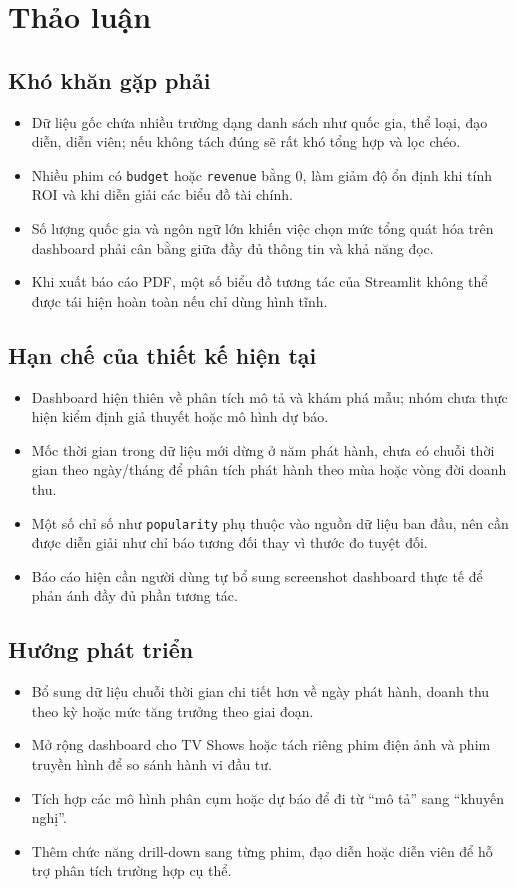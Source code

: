 \section{Thảo luận}

\subsection{Khó khăn gặp phải}
\begin{itemize}[leftmargin=2em]
    \item Dữ liệu gốc chứa nhiều trường dạng danh sách như quốc gia, thể loại, đạo diễn, diễn viên; nếu không tách đúng sẽ rất khó tổng hợp và lọc chéo.
    \item Nhiều phim có \texttt{budget} hoặc \texttt{revenue} bằng 0, làm giảm độ ổn định khi tính ROI và khi diễn giải các biểu đồ tài chính.
    \item Số lượng quốc gia và ngôn ngữ lớn khiến việc chọn mức tổng quát hóa trên dashboard phải cân bằng giữa đầy đủ thông tin và khả năng đọc.
    \item Khi xuất báo cáo PDF, một số biểu đồ tương tác của Streamlit không thể được tái hiện hoàn toàn nếu chỉ dùng hình tĩnh.
\end{itemize}

\subsection{Hạn chế của thiết kế hiện tại}
\begin{itemize}[leftmargin=2em]
    \item Dashboard hiện thiên về phân tích mô tả và khám phá mẫu; nhóm chưa thực hiện kiểm định giả thuyết hoặc mô hình dự báo.
    \item Mốc thời gian trong dữ liệu mới dừng ở năm phát hành, chưa có chuỗi thời gian theo ngày/tháng để phân tích phát hành theo mùa hoặc vòng đời doanh thu.
    \item Một số chỉ số như \texttt{popularity} phụ thuộc vào nguồn dữ liệu ban đầu, nên cần được diễn giải như chỉ báo tương đối thay vì thước đo tuyệt đối.
    \item Báo cáo hiện cần người dùng tự bổ sung screenshot dashboard thực tế để phản ánh đầy đủ phần tương tác.
\end{itemize}

\subsection{Hướng phát triển}
\begin{itemize}[leftmargin=2em]
    \item Bổ sung dữ liệu chuỗi thời gian chi tiết hơn về ngày phát hành, doanh thu theo kỳ hoặc mức tăng trưởng theo giai đoạn.
    \item Mở rộng dashboard cho TV Shows hoặc tách riêng phim điện ảnh và phim truyền hình để so sánh hành vi đầu tư.
    \item Tích hợp các mô hình phân cụm hoặc dự báo để đi từ ``mô tả'' sang ``khuyến nghị''.
    \item Thêm chức năng drill-down sang từng phim, đạo diễn hoặc diễn viên để hỗ trợ phân tích trường hợp cụ thể.
\end{itemize}

